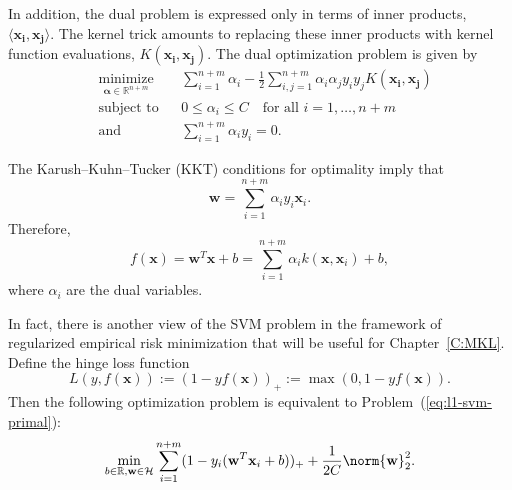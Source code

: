 In addition, the dual problem is expressed only in terms of inner
products, $\langle \mathbf{x_i}, \mathbf{x_j} \rangle$.  The kernel trick
\cite{aizerman1964theoretical} amounts to replacing these inner products
with kernel function evaluations, $K(\mathbf{x_i}, \mathbf{x_j})$.  The
dual optimization problem is given by
\begin{equation}
\label{eq:l1-svm-dual}
\begin{aligned}
& \underset{{\boldsymbol \alpha} \in \mathbb{R}^{n+m}}{\text{minimize}}
& & \sum_{i=1}^{n+m} \alpha_i - \frac{1}{2} \sum_{i,j=1}^{n+m} \alpha_i \alpha_j y_i y_j K(\mathbf{x_i}, \mathbf{x_j})  \\
& \text{subject to}
& & 0 \leq \alpha_i \leq C \quad \text{for all } i=1,\ldots,n+m \\
& \text{and}
& & \sum_{i=1}^{n+m} \alpha_i y_i = 0.
\end{aligned}
\end{equation}

The Karush--Kuhn--Tucker (KKT) \cite{kuhn1951nonlinear} conditions for optimality imply that
\begin{equation*}
  \mathbf{w} = \sum_{i=1}^{n+m} \alpha_i y_i \mathbf{x}_i.
\end{equation*}
Therefore,
\begin{equation*}
  f(\mathbf{x}) = \mathbf{w}^T\mathbf{x} + b = \sum_{i=1}^{n+m} \alpha_i k(\mathbf{x}, \mathbf{x}_i) + b,
\end{equation*}
where $\alpha_i$ are the dual variables.

In fact, there is another view of the SVM problem in the framework of regularized
empirical risk minimization \cite{vapnik1999nature} that will be
useful for Chapter~\ref{C:MKL}.  Define the hinge loss function
\begin{equation*}
  L(y, f(\mathbf{x})) := (1 - yf(\mathbf{x}))_+ := \max(0, 1 - yf(\mathbf{x})).
\end{equation*}
Then the following optimization problem is equivalent to Problem~(\ref{eq:l1-svm-primal}):
\begin{equation}
  \label{eq:hinge-svm}
  \min_{b \in \mathbb{R}, \mathbf{w} \in \mathcal{H}} \sum_{i=1}^{n+m} (1 - y_i(\mathbf{w}^T\mathbf{x}_i + b))_+ +
  \frac{1}{2C} \norm{\mathbf{w}}_2^2.
\end{equation}

